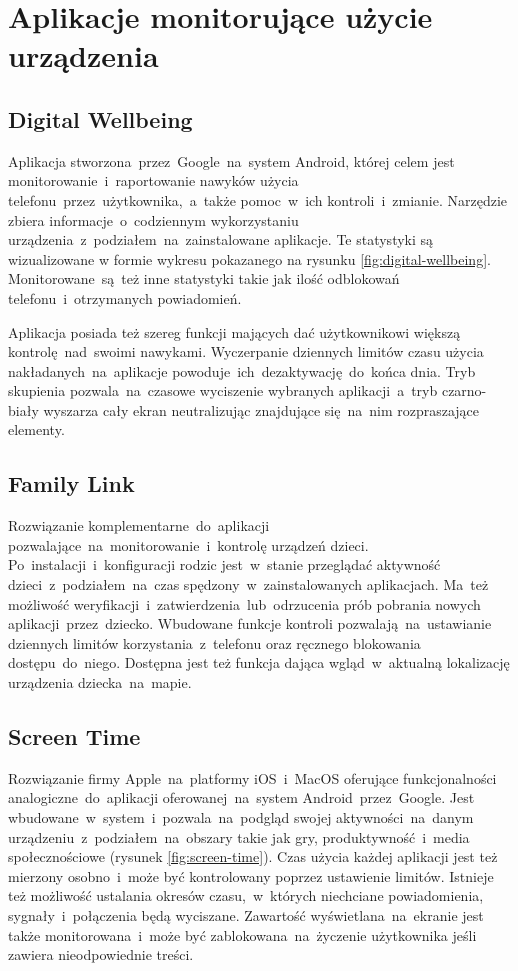 \section{Aplikacje monitorujące użycie urządzenia}

\subsection{Digital Wellbeing}
\label{sec:digital_wellbeing}
Aplikacja stworzona~przez~Google~na~system Android, której celem jest monitorowanie~i~raportowanie nawyków użycia telefonu~przez~użytkownika,~a~także pomoc~w~ich kontroli~i~zmianie. Narzędzie zbiera informacje~o~codziennym wykorzystaniu urządzenia~z~podziałem~na~zainstalowane aplikacje. Te statystyki są wizualizowane w formie wykresu pokazanego na rysunku \ref{fig:digital-wellbeing}. Monitorowane~są~też inne statystyki takie jak ilość odblokowań telefonu~i~otrzymanych powiadomień. 
\bigskip
{}

Aplikacja posiada też szereg funkcji mających dać użytkownikowi większą kontrolę~nad~swoimi nawykami. Wyczerpanie dziennych limitów czasu użycia nakładanych~na~aplikacje powoduje~ich~dezaktywację~do~końca dnia. Tryb skupienia pozwala~na~czasowe wyciszenie wybranych aplikacji~a~tryb czarno-biały wyszarza cały ekran neutralizując znajdujące się~na~nim rozpraszające elementy.

\subsection{Family Link}
Rozwiązanie komplementarne~do~aplikacji  pozwalające~na~monitorowanie~i~kontrolę urządzeń dzieci. Po~instalacji~i~konfiguracji rodzic jest~w~stanie przeglądać aktywność dzieci~z~podziałem~na~czas spędzony~w~zainstalowanych aplikacjach. Ma~też możliwość weryfikacji~i~zatwierdzenia~lub~odrzucenia prób pobrania nowych aplikacji~przez~dziecko. Wbudowane funkcje kontroli pozwalają~na~ustawianie dziennych limitów korzystania~z~telefonu oraz ręcznego blokowania dostępu~do~niego. Dostępna jest też funkcja dająca wgląd~w~aktualną lokalizację urządzenia dziecka~na~mapie.

\subsection{Screen Time}
Rozwiązanie firmy Apple~na~platformy iOS~i~MacOS oferujące funkcjonalności analogiczne~do~aplikacji  oferowanej~na~system Android~przez~Google. Jest wbudowane~w~system~i~pozwala~na~podgląd swojej aktywności~na~danym urządzeniu~z~podziałem~na~obszary takie jak gry, produktywność~i~media społecznościowe (rysunek \ref{fig:screen-time}). Czas użycia każdej aplikacji jest też mierzony osobno~i~może być kontrolowany poprzez ustawienie limitów. Istnieje też możliwość ustalania okresów czasu,~w~których niechciane powiadomienia, sygnały~i~połączenia będą wyciszane. Zawartość wyświetlana~na~ekranie jest także monitorowana~i~może być zablokowana~na~życzenie użytkownika jeśli zawiera nieodpowiednie treści.

